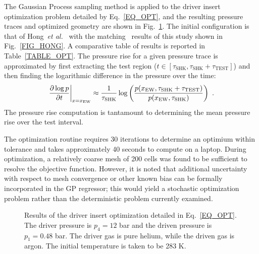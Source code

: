 The Gaussian Process sampling method is applied to the driver insert optimization problem detailed by Eq.~\ref{EQ_OPT}, and the resulting pressure traces and optimized geometry are shown in Fig.~\ref{FIG_OPT}. The initial configuration is that of Hong~\emph{et al.}~\cite{HONG_PANG_VASU_DAVIDSON_HANSON_SW2009} with the matching \stnshk\ results of this study shown in Fig.~\ref{FIG_HONG}. A comparative table of results is reported in Table~\ref{TABLE_OPT}. The pressure rise for a given pressure trace is approximated by first extracting the test region ($t\in[\tau_\mathrm{SHK},\tau_\mathrm{SHK}+\tau_\mathrm{TEST}]$) and then finding the logarithmic difference in the pressure over the time:
\begin{equation}\label{EQ_PR}
\left . \frac{\p \log p}{\p t}\right |_{x=x_\mathrm{EW}}\approx\frac{1}{\tau_\mathrm{SHK}}\log\left (\frac{ p(x_\mathrm{EW},\tau_\mathrm{SHK}+\tau_\mathrm{TEST})}{p(x_\mathrm{EW},\tau_\mathrm{SHK})}\right)\ .
\end{equation}
The pressure rise computation is tantamount to determining the mean pressure rise over the test interval. 

The optimization routine requires 30 iterations to determine an optimium within tolerance and takes approximately 40 seconds to compute on a laptop. During optimization, a relatively coarse mesh of 200 cells was found to be sufficient to resolve the objective function. However, it is noted that additional uncertainty with respect to mesh convergence or other known bias can be formally incorporated in the GP regressor; this would yield a stochastic optimization problem rather than the deterministic problem currently examined.   

\begin{figure}[!ht!]
	\centering
	\caption{\label{FIG_OPT} Results of the driver insert optimization detailed in Eq.~\ref{EQ_OPT}. The driver pressure is $p_4=12$ bar and the driven pressure is $p_1=0.48$ bar. The driver gas is pure helium, while the driven gas is argon. The initial temperature is taken to be 283 K.}
\end{figure}

